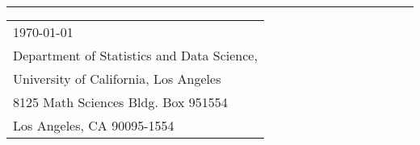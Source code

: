\documentclass[12pt]{article}
\begin{document}
\vspace*{\dimexpr-\headsep-\headheight-1pt}


\rule{\linewidth}{1pt}

\bigskip



\newcommand{\PaperTitle}{Nonparametric Block Bootstrap Kolmogorov-Smirnov Goodness-of-Fit Test\xspace}

\newcommand{\AuthorOne}{Mathew Chandy\xspace}
\newcommand{\AuthorTwo}{Elizabeth D. Schifano\xspace}
\newcommand{\AuthorThree}{Jun Yan\xspace}
\newcommand{\AuthorFour}{Xianyang Zhang\xspace}


\newcommand{\EditorInChief}{Min-ge Xie\xspace}

\newcommand{\Journal}{The American Statistician\xspace}

\newcommand{\Contribution}{X\xspace}
\newcommand{\Problem}{Y\xspace}
\newcommand{\Solution}{Z\xspace}
\newcommand{\Evaluation}{D\xspace}
\newcommand{\NoveltyClaim}{E\xspace}

\newcommand{\ContributionOne}{Contribution A.\xspace}
\newcommand{\ContributionTwo}{Contribution B.\xspace}
\newcommand{\ContributionThree}{Contribution C.\xspace}
\newcommand{\ContributionFour}{Contribution D.\xspace}

\newcommand{\EditorOne}{Editor \#1\xspace}
\newcommand{\EditorOneExpertise}{A\xspace}

\newcommand{\EditorTwo}{Editor \#2\xspace}
\newcommand{\EditorTwoExpertise}{B\xspace}

\newcommand{\EditorThree}{Editor \#3\xspace}
\newcommand{\EditorThreeExpertise}{C\xspace}


\hfill
\begin{tabular}{ l @{} }
  \today \\[12pt] %
  Department of Statistics and Data Science,\\
  University of California, Los Angeles\\
  8125 Math Sciences Bldg. Box 951554\\
  Los Angeles, CA 90095-1554
\end{tabular}
\end{document}
